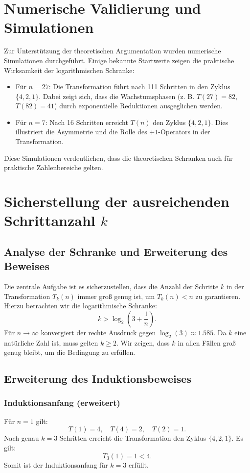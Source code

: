 \documentclass[a4paper,12pt]{article}
\begin{document}
\section{Numerische Validierung und Simulationen}
Zur Unterstützung der theoretischen Argumentation wurden numerische Simulationen durchgeführt. Einige bekannte Startwerte zeigen die praktische Wirksamkeit der logarithmischen Schranke:

\begin{itemize}
    \item Für \( n = 27 \): Die Transformation führt nach 111 Schritten in den Zyklus \( \{4, 2, 1\} \). Dabei zeigt sich, dass die Wachstumsphasen (z. B. \( T(27) = 82 \), \( T(82) = 41 \)) durch exponentielle Reduktionen ausgeglichen werden.
    \item Für \( n = 7 \): Nach 16 Schritten erreicht \( T(n) \) den Zyklus \( \{4, 2, 1\} \). Dies illustriert die Asymmetrie und die Rolle des \(+1\)-Operators in der Transformation.
\end{itemize}

Diese Simulationen verdeutlichen, dass die theoretischen Schranken auch für praktische Zahlenbereiche gelten.

\section{Sicherstellung der ausreichenden Schrittanzahl \( k \)}

\subsection{Analyse der Schranke und Erweiterung des Beweises}
Die zentrale Aufgabe ist es sicherzustellen, dass die Anzahl der Schritte \( k \) in der Transformation \( T_k(n) \) immer groß genug ist, um \( T_k(n) < n \) zu garantieren. Hierzu betrachten wir die logarithmische Schranke:
\[
k > \log_2\left(3 + \frac{1}{n}\right).
\]
Für \( n \to \infty \) konvergiert der rechte Ausdruck gegen \(\log_2(3) \approx 1.585\). Da \( k \) eine natürliche Zahl ist, muss gelten \( k \geq 2 \). Wir zeigen, dass \( k \) in allen Fällen groß genug bleibt, um die Bedingung zu erfüllen.

\subsection{Erweiterung des Induktionsbeweises}
\subsubsection{Induktionsanfang (erweitert)}
Für \( n = 1 \) gilt:
\[
T(1) = 4, \quad T(4) = 2, \quad T(2) = 1.
\]
Nach genau \( k = 3 \) Schritten erreicht die Transformation den Zyklus \(\{4, 2, 1\}\). Es gilt:
\[
T_3(1) = 1 < 4.
\]
Somit ist der Induktionsanfang für \( k = 3 \) erfüllt.
\end{document}
